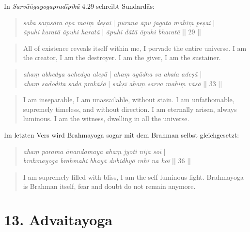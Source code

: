 In \textit{Sarvāṅgayogapradīpikā} 4.29 schreibt Sundardās:
\begin{quote}
\textit{saba saṃsāra āpa maiṃ deṣai} | \textit{pūraṇa āpu jagata mahiṃ peṣai} |\\
\textit{āpuhi karatā āpuhi haratā} | \textit{āpuhi dātā āpuhi bharatā} || 29 || 
\end{quote}
\begin{quote}
  All of existence reveals itself within me, I pervade the entire universe. 
  I am the creator, I am the destroyer. I am the giver, I am the sustainer.
\end{quote}
\begin{quote}
\textit{ahaṃ abhedya achedya aleṣā} | \textit{ahaṃ agādha su akala adeṣā} | \\
\textit{ahaṃ sadodita sadā prakāśā} | \textit{sakṣī ahaṃ sarva mahiṃ vāsā} || 33 ||
\end{quote}
\begin{quote}
  I am inseparable, I am unassailable, without stain. I am unfathomable, supremely timeless, and without direction.
  I am eternally arisen, always luminous. I am the witness, dwelling in all the universe.
\end{quote}

Im letzten Vers wird Brahmayoga sogar mit dem Brahman selbst gleichgesetzt:
\begin{quote}
\textit{ahaṃ parama ānandamaya ahaṃ jyoti nija soī} |\\
\textit{brahmayoga brahmahi bhayā dubidhyā rahī na koī} || 36 ||
\end{quote}
\begin{quote}
I am supremely filled with bliss, I am the self-luminous light. Brahmayoga is Brahman itself, fear and doubt do not remain anymore.
\end{quote}

\section{13. Advaitayoga}
\label{advaitayogaintro}


